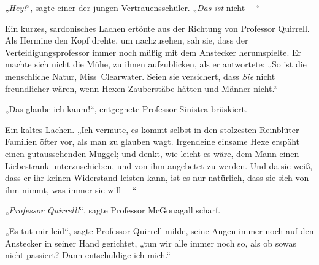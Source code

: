 „\emph{Hey!}“, sagte einer der jungen Vertrauensschüler.
„\emph{Das ist} nicht —“

Ein kurzes, sardonisches Lachen ertönte aus der Richtung von Professor Quirrell. Als Hermine den Kopf drehte, um nachzusehen, sah sie, dass der Verteidigungsprofessor immer noch müßig mit dem Anstecker herumspielte. Er machte sich nicht die Mühe, zu ihnen aufzublicken, als er antwortete:
„So ist die menschliche Natur, Miss~Clearwater. Seien sie versichert, dass \emph{Sie} nicht freundlicher wären, wenn Hexen Zauberstäbe hätten und Männer nicht.“

„Das glaube ich kaum!“, entgegnete Professor Sinistra brüskiert.

Ein kaltes Lachen.
„Ich vermute, es kommt selbst in den stolzesten Reinblüter-Familien öfter vor, als man zu glauben wagt. Irgendeine einsame Hexe erspäht einen gutaussehenden Muggel; und denkt, wie leicht es wäre, dem Mann einen Liebestrank unterzuschieben, und von ihm angebetet zu werden. Und da sie weiß, dass er ihr keinen Widerstand leisten kann, ist es nur natürlich, dass sie sich von ihm nimmt, was immer sie will —“

„\emph{Professor Quirrell!}“, sagte Professor McGonagall scharf.

„Es tut mir leid“, sagte Professor Quirrell milde, seine Augen immer noch auf den Anstecker in seiner Hand gerichtet, „tun wir alle immer noch so, als ob sowas nicht passiert? Dann entschuldige ich mich.“


